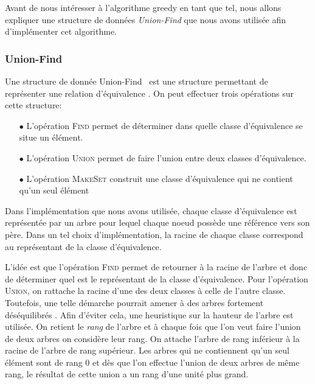 Avant de nous intéresser à l'algorithme greedy en tant que tel, nous allons expliquer une structure de données \emph{Union-Find} que nous avons utilisée afin d'implémenter cet algorithme.

\subsubsection{Union-Find}

Une structure de donnée \og Union-Find \fg~est une structure permettant de représenter une relation d'équivalence . On peut effectuer trois opérations sur cette structure:
\begin{itemize}
\item[$\bullet$] L'opération \textsc{Find} permet de déterminer dans quelle classe d'équivalence se situe un élément.
\item[$\bullet$] L'opération \textsc{Union} permet de faire l'union entre deux classes d'équivalence.
\item[$\bullet$] L'opération \textsc{MakeSet} construit une classe d'équivalence qui ne contient qu'un seul élément
\end{itemize}

Dans l'implémentation que nous avons utilisée, chaque classe d'équivalence est représentée par un arbre pour lequel chaque noeud possède une référence vers son père. Dans un tel choix d'implémentation, la racine de chaque classe correspond au représentant de la classe d'équivalence.

L'idée est que l'opération \textsc{Find} permet de retourner à la racine de l'arbre et donc de déterminer quel est le représentant de la classe d'équivalence. Pour l'opération \textsc{Union}, on rattache la racine d'une des deux classes à celle de l'autre classe. Toutefois, une telle démarche pourrait amener à des arbres fortement déséquilibrés . Afin d'éviter cela, une heuristique sur la hauteur de l'arbre est utilisée. On retient le \emph{rang} de l'arbre et à chaque fois que l'on veut faire l'union de deux arbres on considère leur rang. On attache l'arbre de rang inférieur à la racine de l'arbre de rang supérieur. Les arbres qui ne contiennent qu'un seul élément sont de rang 0 et dès que l'on effectue l'union de deux arbres de même rang, le résultat de cette union a un rang d'une unité plus grand.